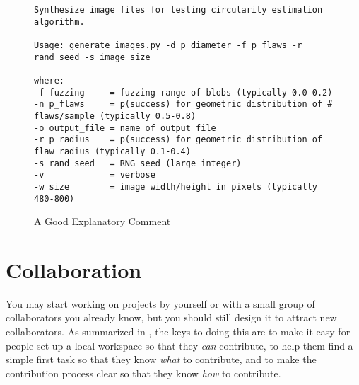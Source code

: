 \documentclass[10pt]{article}
\begin{document}
\begin{figure}
\begin{verbatim}
Synthesize image files for testing circularity estimation algorithm.

Usage: generate_images.py -d p_diameter -f p_flaws -r rand_seed -s image_size

where:
-f fuzzing     = fuzzing range of blobs (typically 0.0-0.2)
-n p_flaws     = p(success) for geometric distribution of # flaws/sample (typically 0.5-0.8)
-o output_file = name of output file
-r p_radius    = p(success) for geometric distribution of flaw radius (typically 0.1-0.4)
-s rand_seed   = RNG seed (large integer)
-v             = verbose
-w size        = image width/height in pixels (typically 480-800)
\end{verbatim}
\caption{A Good Explanatory Comment}
\label{fig:comment}
\end{figure}

\section{Collaboration}\label{sec:collaboration}

You may start working on projects by yourself or with a small group of
collaborators you already know, but you should still design it to
attract new collaborators.  As summarized in \cite{steinmacher2015},
the keys to doing this are to make it easy for people set up a local
workspace so that they \emph{can} contribute, to help them find a
simple first task so that they know \emph{what} to contribute, and to
make the contribution process clear so that they know \emph{how} to
contribute.
\end{document}
